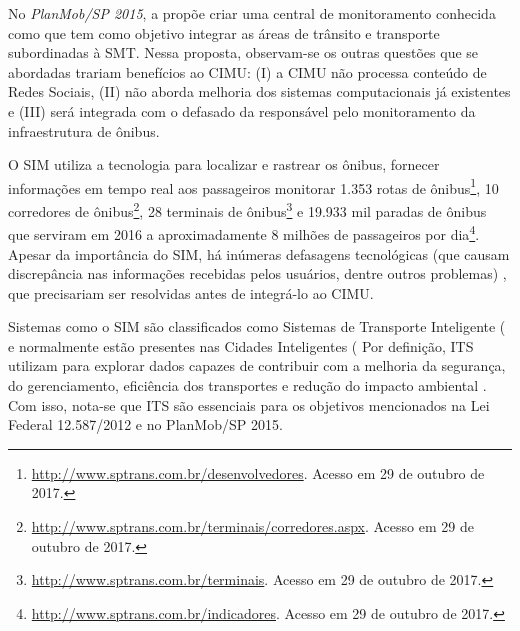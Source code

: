 \documentclass[
	12pt,				%
	oneside,			%
	a4paper,			%
	english,			%
	brazil				%
	]{abntex2ppgsi}
\begin{document}
No \textit{PlanMob/SP 2015}, a  propõe criar uma central de monitoramento conhecida como  que tem como objetivo integrar as áreas de trânsito e transporte subordinadas à SMT. Nessa proposta, observam-se os outras questões que se abordadas trariam benefícios ao CIMU: (I) a CIMU não processa conteúdo de Redes Sociais, (II) não aborda melhoria dos sistemas computacionais já existentes e (III) será integrada com o defasado \cite{consulo2016evaluation}  da  responsável pelo monitoramento da infraestrutura de ônibus. 

O SIM utiliza a tecnologia  para localizar e rastrear os ônibus, fornecer informações em tempo real aos passageiros  monitorar 1.353 rotas de ônibus\footnote{\label{gtfsSptrans}\url{http://www.sptrans.com.br/desenvolvedores}. Acesso em 29 de outubro de 2017.}, 10 corredores de ônibus\footnote{\url{http://www.sptrans.com.br/terminais/corredores.aspx}. Acesso em 29 de outubro de 2017.}, 28 terminais de ônibus\footnote{\url{http://www.sptrans.com.br/terminais}. Acesso em 29 de outubro de 2017.} e 19.933 mil paradas de ônibus que serviram em 2016 a aproximadamente 8 milhões de passageiros por dia\footnote{\url{http://www.sptrans.com.br/indicadores}. Acesso em 29 de outubro de 2017.}. Apesar da importância do SIM, há inúmeras defasagens tecnológicas (que causam discrepância nas informações recebidas pelos usuários, dentre outros problemas) \cite{consulo2016evaluation}, que precisariam ser resolvidas antes de integrá-lo ao CIMU.
 
Sistemas como o SIM são classificados como Sistemas de Transporte Inteligente ( e normalmente estão presentes nas Cidades Inteligentes ( Por definição, ITS utilizam  para explorar dados capazes de contribuir com a melhoria da segurança, do gerenciamento, eficiência dos transportes e redução do impacto ambiental \cite{Anttiroiko2013}. Com isso, nota-se que ITS são essenciais para os objetivos mencionados na Lei Federal 12.587/2012 e no PlanMob/SP 2015.  
\end{document}
